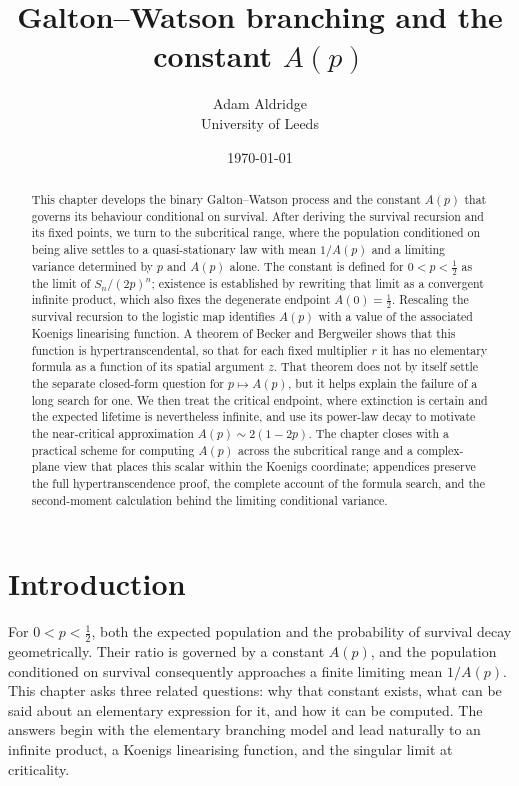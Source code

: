 \documentclass[11pt]{article}
\title{Galton--Watson branching and the constant $A(p)$}
\author{Adam Aldridge\\\normalsize University of Leeds}
\date{\today}
\begin{document}
\maketitle
\tableofcontents
\clearpage

\begin{abstract}
    \noindent
This chapter develops the binary Galton--Watson process and the constant $A(p)$
that governs its behaviour conditional on survival. After deriving the survival
recursion and its fixed points, we turn to the subcritical range, where the
population conditioned on being alive settles to a quasi-stationary law with mean
$1/A(p)$ and a limiting variance determined by $p$ and $A(p)$ alone. The constant
is defined for $0<p<\tfrac12$ as the limit of $S_n/(2p)^n$; existence is established
by rewriting that limit as a convergent infinite product, which also fixes the
degenerate endpoint $A(0)=\tfrac12$. Rescaling the survival recursion to the
logistic map identifies $A(p)$ with a value of the associated Koenigs linearising
function. A theorem of Becker and Bergweiler shows that this function is
hypertranscendental, so that for each fixed multiplier $r$ it has no elementary
formula as a function of its spatial argument $z$. That theorem does not by
itself settle the separate closed-form question for $p\mapsto A(p)$, but it helps
explain the failure of a long search for one. We then treat the critical endpoint, where extinction is certain
and the expected lifetime is nevertheless infinite, and use its power-law decay
to motivate the near-critical approximation $A(p)\sim2(1-2p)$. The chapter closes
with a practical scheme for computing $A(p)$ across the subcritical range and a
complex-plane view that places this scalar within the Koenigs coordinate;
appendices preserve the full hypertranscendence proof, the complete account of
the formula search, and the second-moment calculation behind the limiting
conditional variance.
\end{abstract}

\section{Introduction}

For $0<p<\tfrac12$, both the expected population and the probability of survival
decay geometrically. Their ratio is governed by a constant $A(p)$, and the
population conditioned on survival consequently approaches a finite limiting mean
$1/A(p)$. This chapter asks three related questions: why that constant exists,
what can be said about an elementary expression for it, and how it can be
computed.
The answers begin with the elementary branching model and lead naturally to an
infinite product, a Koenigs linearising function, and the singular limit at
criticality.
\end{document}
